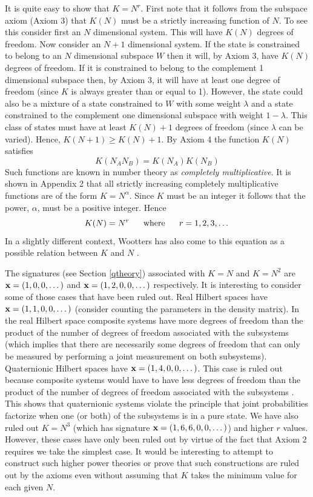 \documentclass[12pt]{article}
\begin{document}
It is quite easy to show that $K=N^r$.  First note that it
follows from the subspace axiom (Axiom 3) that $K(N)$ must be a strictly
increasing function of $N$.  To see this consider first an $N$
dimensional system. This will have $K(N)$ degrees of freedom. Now
consider an $N+1$ dimensional system. If the state is constrained to
belong to an $N$ dimensional subspace $W$ then it will, by Axiom 3, have
$K(N)$ degrees of freedom. If it is constrained to belong to the
complement 1 dimensional subspace then, by Axiom 3, it will have at
least one degree of freedom (since $K$ is always greater than or equal
to 1).  However, the state could also be a mixture of a state
constrained to $W$ with some weight $\lambda$ and a state constrained to
the complement one dimensional subspace with weight $1-\lambda$.  This
class of states must have at least $K(N)+1$ degrees of freedom (since
$\lambda$ can be varied).  Hence, $K(N+1)\geq K(N)+1$.  By Axiom 4 the
function $K(N)$ satisfies
\begin{equation}
K(N_AN_B)=K(N_A)K(N_B)
\end{equation}
Such functions are known in number theory as {\it completely
multiplicative}.  It is shown in Appendix 2 that all strictly
increasing completely multiplicative functions are of the form
$K=N^\alpha$.  Since $K$ must be an integer it follows that the power,
$\alpha$, must be a positive integer. Hence
\begin{equation}
K(N)=N^r {\rm ~~~~~where~~~~~} r=1,2,3,\dots
\end{equation}
In a slightly different context, Wootters has also come to this equation
as a possible relation between $K$ and $N$ \cite{wootters}.

The signatures (see Section \ref{qtheory}) associated with $K=N$ and
$K=N^2$ are ${\bf x}=(1,0,0,\dots)$ and ${\bf x}=(1,2,0,0,\dots)$ respectively.
It is interesting to consider some of those cases that have been ruled out.
Real Hilbert spaces have ${\bf x}=(1,1,0,0,\dots)$ (consider counting
the parameters in the density matrix).  In the real Hilbert space composite
systems have more degrees of freedom than the product of the number of
degrees of freedom associated with the subsystems (which implies that
there are necessarily some degrees of freedom that can only be measured
by performing a joint measurement on both subsystems).
Quaternionic Hilbert spaces have
${\bf x}=(1,4,0,0,\dots)$.  This case is ruled out because
composite systems would have to have less degrees of
freedom than the product of the number of degrees of freedom associated
with the subsystems \cite{fuchs}. This shows that quaternionic systems
violate the principle that joint probabilities factorize when one (or
both) of the subsystems is in a pure state.
We have also ruled out $K=N^3$ (which
has signature ${\bf x}=(1,6,6,0,0,\dots)$) and
higher $r$ values.  However, these cases have only been ruled out by
virtue of the fact that Axiom 2 requires we take the simplest case.  It
would be interesting to attempt to construct such higher power theories
or prove that such constructions are ruled out by the axioms even
without assuming that $K$ takes the minimum value for each given $N$.
\end{document}
